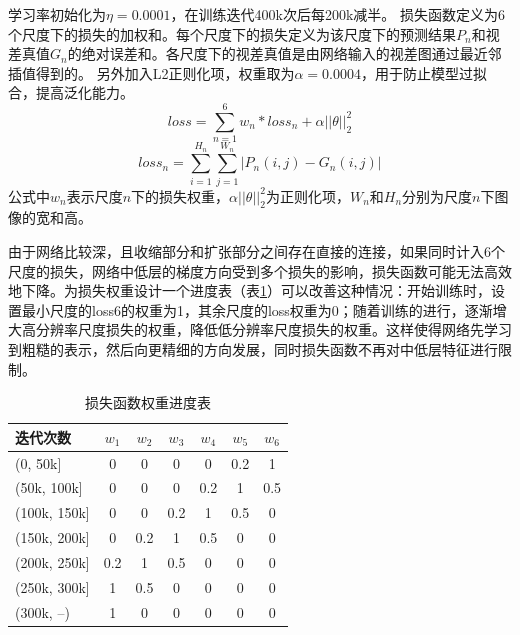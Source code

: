 学习率初始化为$\eta=0.0001$，在训练迭代400k次后每200k减半。
损失函数定义为6个尺度下的损失的加权和。每个尺度下的损失定义为该尺度下的预测结果$P_n$和视差真值$G_n$的绝对误差和。各尺度下的视差真值是由网络输入的视差图通过最近邻插值得到的。
另外加入L2正则化项，权重取为$\alpha=0.0004$，用于防止模型过拟合，提高泛化能力。
\begin{equation}\label{eq:4_2_loss_all}
loss = \sum_{n=1}^{6}{w_n * loss_n} + \alpha ||\theta||_2^2
\end{equation}
\begin{equation}\label{eq:4_2_loss_single}
loss_n = \sum_{i=1}^{H_n}\sum_{j=1}^{W_n}{|P_n(i, j) - G_n(i, j)|}
\end{equation}
公式中$w_n$表示尺度$n$下的损失权重，$\alpha||\theta||_2^2$为正则化项，$W_n$和$H_n$分别为尺度$n$下图像的宽和高。

由于网络比较深，且收缩部分和扩张部分之间存在直接的连接，如果同时计入6个尺度的损失，网络中低层的梯度方向受到多个损失的影响，损失函数可能无法高效地下降。为损失权重设计一个进度表（表\ref{tab:4_2_loss_weight_schedule}）可以改善这种情况：开始训练时，设置最小尺度的loss6的权重为1，其余尺度的loss权重为0；随着训练的进行，逐渐增大高分辨率尺度损失的权重，降低低分辨率尺度损失的权重。这样使得网络先学习到粗糙的表示，然后向更精细的方向发展，同时损失函数不再对中低层特征进行限制。

\begin{table}[htb]
	\centering
	\caption{损失函数权重进度表}
	\label{tab:4_2_loss_weight_schedule}
	\begin{small} %
		\begin{tabular}{|l|cccccc|}\hline
			迭代次数  & $w_1$ & $w_2$ & $w_3$ & $w_4$ & $w_5$ & $w_6$ \\\hline
			(0, 50k]           & 0 & 0 & 0 & 0 & 0.2 & 1 \\
			(50k, 100k]     & 0 & 0 & 0 & 0.2 & 1 & 0.5 \\
			(100k, 150k]    & 0 & 0 & 0.2 & 1 & 0.5 & 0 \\
			(150k, 200k]    & 0 & 0.2 & 1 & 0.5 & 0 & 0 \\
			(200k, 250k]    & 0.2 & 1 & 0.5 & 0 & 0 & 0  \\
			(250k, 300k]    & 1 & 0.5 & 0 & 0 & 0 & 0  \\
			(300k, --)          & 1 & 0 & 0 & 0 & 0 & 0 \\\hline
		\end{tabular}
	\end{small} %
\end{table}

